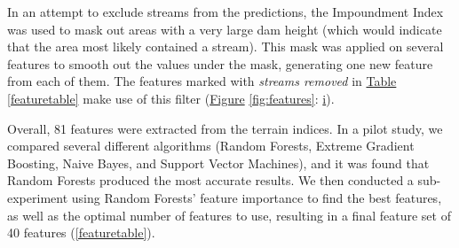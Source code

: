 \documentclass[11pt, review]{elsarticle} %
\begin{document}
\label{impoundmentstreamremoval}
In an attempt to exclude streams from the predictions, the Impoundment Index was used to mask out areas with a very large dam height (which would indicate that the area most likely contained a stream). This mask was applied on several features to smooth out the values under the mask, generating one new feature from each of them. The features marked with \textit{streams removed} in \hyperref[featuretable]{Table} \ref{featuretable} make use of this filter (\hyperref[fig:features]{Figure} \ref{fig:features}: \hyperref[fig:features]{i}).

Overall, 81 features were extracted from the terrain indices. In a pilot study, we compared several different algorithms (Random Forests, Extreme Gradient Boosting, Naive Bayes, and Support Vector Machines), and it was found that Random Forests produced the most accurate results. We then conducted a sub-experiment using Random Forests' feature importance to find the best features, as well as the optimal number of features to use, resulting in a final feature set of 40 features (\autoref{featuretable}).
\end{document}
